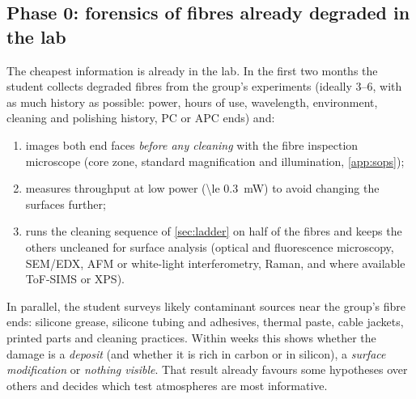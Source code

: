 \subsection{Phase 0: forensics of fibres already degraded in the lab}\label{sec:forensics}
The cheapest information is already in the lab. In the first two months the student collects
degraded fibres from the group's experiments (ideally 3--6, with as much history as possible:
power, hours of use, wavelength, environment, cleaning and polishing history, PC or APC ends) and:
\begin{enumerate}
  \item images both end faces \emph{before any cleaning} with the fibre inspection microscope (core
        zone, standard magnification and illumination, \cref{app:sops});
  \item measures throughput at low power (\SI{\le 0.3}{mW}) to avoid changing the surfaces further;
  \item runs the cleaning sequence of \cref{sec:ladder} on half of the fibres and keeps the others
        uncleaned for surface analysis (optical and fluorescence microscopy, SEM/EDX, AFM or
        white-light interferometry, Raman, and where available ToF-SIMS or XPS).
\end{enumerate}
In parallel, the student surveys likely contaminant sources near the group's fibre ends: silicone
grease, silicone tubing and adhesives, thermal paste, cable jackets, printed parts and cleaning
practices. Within weeks this shows whether the damage is a \emph{deposit} (and whether it is rich in carbon
or in silicon), a \emph{surface modification} or \emph{nothing visible}. That result already favours some hypotheses
over others and decides which test atmospheres are most informative.

